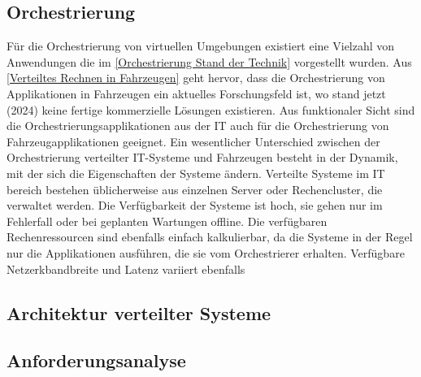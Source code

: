 \subsection{Orchestrierung}
Für die Orchestrierung von virtuellen Umgebungen existiert eine Vielzahl von Anwendungen die im \autoref{Orchestrierung Stand der Technik} vorgestellt wurden. Aus \autoref{Verteiltes Rechnen in Fahrzeugen} geht hervor, dass die Orchestrierung von Applikationen in Fahrzeugen ein aktuelles Forschungsfeld ist, wo stand jetzt (2024) keine fertige kommerzielle Lösungen existieren. Aus funktionaler Sicht sind die Orchestrierungsapplikationen aus der IT auch für die Orchestrierung von Fahrzeugapplikationen geeignet. Ein wesentlicher Unterschied zwischen der Orchestrierung verteilter IT-Systeme und Fahrzeugen besteht in der Dynamik, mit der sich die Eigenschaften der Systeme ändern. Verteilte Systeme im IT bereich bestehen üblicherweise aus einzelnen Server oder Rechencluster, die verwaltet werden. Die Verfügbarkeit der Systeme ist hoch, sie gehen nur im Fehlerfall oder bei geplanten Wartungen offline. Die verfügbaren Rechenressourcen sind ebenfalls einfach kalkulierbar, da die Systeme in der Regel nur die Applikationen ausführen, die sie vom Orchestrierer erhalten. Verfügbare Netzerkbandbreite und Latenz variiert ebenfalls 
 
\subsection{Architektur verteilter Systeme}

\subsection{Anforderungsanalyse}


